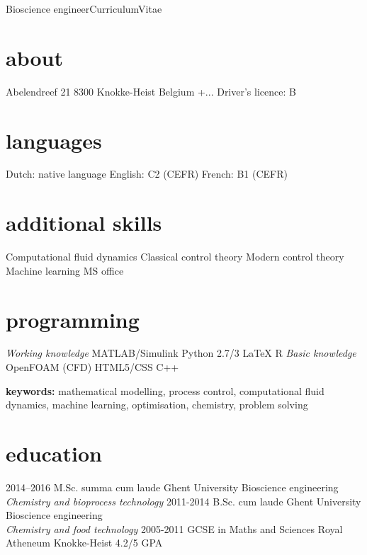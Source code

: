 \documentclass[]{friggeri-cv}
\begin{document}
       {Bioscience engineer}{Curriculum}{Vitae}
\begin{aside}
  \section{about}
    Abelendreef 21
    8300 Knokke-Heist
    Belgium \vspace{0.21cm}
    +...
     \vspace{0.21cm}
    Driver's licence: B \vspace{-1.25mm}
  \section{languages}
    Dutch: native language
    English: C2 (CEFR)
    French:  B1  (CEFR) \vspace{3.3mm}
  \section{additional skills}
  Computational fluid dynamics
  Classical control theory 
  Modern control theory 
  Machine learning
  MS office \vspace{8mm}
  \section{programming} 
  \textit{Working knowledge}
  MATLAB/Simulink
  Python 2.7/3
  LaTeX
  R \vspace{0.1cm}
  \textit{Basic knowledge}
  OpenFOAM (CFD)
  HTML5/CSS
  C++
\end{aside}
\vspace{3mm}
\textbf{keywords:} mathematical modelling, process control, computational fluid dynamics, machine learning, optimisation, chemistry, problem solving
\vspace{3mm}

\section{education}
\begin{entrylist}
    \entry
    {2014–2016}
    {M.Sc. summa cum laude}
    {Ghent University}
    {Bioscience engineering\\
    \emph{Chemistry and bioprocess technology}}
  \entry
    {2011-2014}
    {B.Sc. cum laude}
    {Ghent University}
    {Bioscience engineering\\
    \emph{Chemistry and food technology}}
  \entry
    {2005-2011}
    {GCSE in Maths and Sciences}
    {Royal Atheneum Knokke-Heist}
    {4.2/5 GPA}
\end{entrylist}
\end{document}
